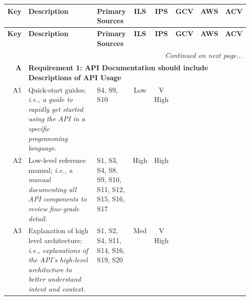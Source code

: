 {\def\cn{}
\def\cy{\checkmark}
\footnotesize
\begin{longtable}{rp{0.45\linewidth}|p{0.125\linewidth}|cc|ccc}
  \toprule
  \textbf{Key} &
  \textbf{Description} &
  \textbf{Primary Sources} &
  \textbf{ILS} &
  \textbf{IPS} & 
  \textbf{GCV} &
  \textbf{AWS} &
  \textbf{ACV} \\
  \midrule
  \midrule
  \endfirsthead
  \toprule
  \textbf{Key} &
  \textbf{Description} &
  \textbf{Primary Sources} &
  \textbf{ILS} &
  \textbf{IPS} &
  \textbf{GCV} &
  \textbf{AWS} &
  \textbf{ACV} \\
  \midrule
  \midrule
  \endhead
  \bottomrule
  
  \multicolumn{8}{r}{\textit{Continued on next page...}}\\
  \endfoot
  \bottomrule
  \endlastfoot


   \textbf{A}&
  \multicolumn{7}{l}{\textbf{Requirement 1: API Documentation should include Descriptions of API Usage}}\\
  \midrule

  A1&
  Quick-start guides; \textit{i.e., a guide to rapidly get started using the API in a specific programming language.}&
  \scriptsize S4, S9, S10 &
  \cellcolor[HTML]{f6b26b}Low&\cellcolor[HTML]{57bb8a}V High&\circlepresent{}&\circlepartialpresent{}&\circlepresent{}\\
  
  A2&
  Low-level reference manual; \textit{i.e., a manual documenting all API components to review fine-grade detail.}&
  \scriptsize S1, S3, S4, S8, S9, S10, S11, S12, S15, S16, S17 &
  \cellcolor[HTML]{a7c47d}High&\cellcolor[HTML]{a7c47d}High&\circlepresent{}&\circlepresent{}&\circlepresent{}\\
  
  A3&
  Explanation of high level architecture; \textit{i.e., explanations of the API's high-level architecture to better understand intent and context.}
  &
  \scriptsize S1, S2, S4, S11, S14, S16, S19, S20 &
  \cellcolor[HTML]{ffd666}Med&\cellcolor[HTML]{57bb8a}V High&\circlepresent{}&\circlepresent{}&\circlepresent{}\\


\end{longtable}}

